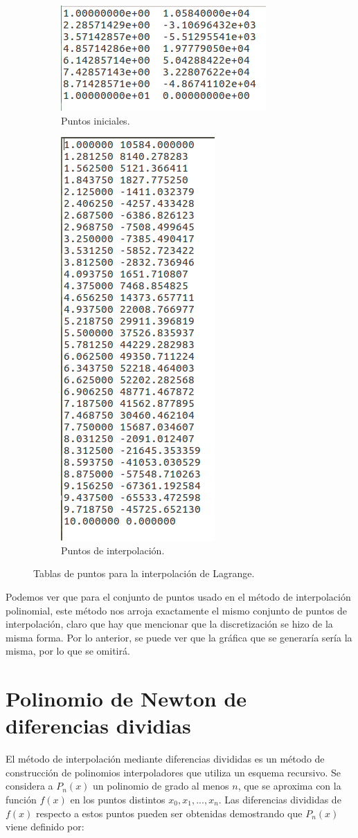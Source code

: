 \documentclass[12pt]{article}
\begin{document}
\begin{figure}[H]
	\centering
	\begin{subfigure}{0.6\textwidth}
		\centering
		\includegraphics[width=.3\linewidth]{E1.png}
		\caption{Puntos iniciales.}
	\end{subfigure}%
	\begin{subfigure}{0.5\textwidth}
		\centering
		\includegraphics[width=.3\linewidth]{E3.png}
		\caption{Puntos de interpolación.}
	\end{subfigure}
	\caption{Tablas de puntos para la interpolación de Lagrange.}
\end{figure}

Podemos ver que para el conjunto de puntos usado en el método de interpolación polinomial, este método nos arroja exactamente el mismo conjunto de puntos de interpolación, claro que hay que mencionar que la discretización se hizo de la misma forma. Por lo anterior, se puede ver que la gráfica que se generaría sería la misma, por lo que se omitirá.

\section{Polinomio de Newton de diferencias dividias}
El método de interpolación mediante diferencias divididas es un método de construcción de polinomios interpoladores que utiliza un esquema recursivo. Se considera a $P_n(x)$ un polinomio de grado al menos $n$, que se aproxima con la función $f(x)$ en los puntos distintos $x_0, x_1, ..., x_n$. Las diferencias divididas de $f(x)$ respecto a estos puntos pueden ser obtenidas demostrando que $P_n(x)$ viene definido por:
\end{document}
